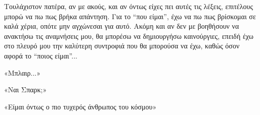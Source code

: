 \documentclass[12pt,twoside, openany]{book}
\begin{document}
Τουλάχιστον πατέρα, αν με ακούς, και αν όντως είχες πει αυτές τις λέξεις, επιτέλους μπορώ να πω πως βρήκα απάντηση. Για το “που είμαι”, έχω να πω πως βρίσκομαι σε καλά χέρια, οπότε μην αγχώνεσαι για αυτό. Ακόμη και αν δεν με βοηθήσουν να ανακτήσω τις αναμνήσεις μου, θα μπορέσω να δημιουργήσω καινούργιες, επειδή έχω στο πλευρό μου την καλύτερη συντροφιά που θα μπορούσα να έχω, καθώς όσον αφορά το “ποιος είμαι”...

«Μπλαιρ...»

«Ναι Σπαρκ;»

«Είμαι όντως ο πιο τυχερός άνθρωπος του κόσμου»


\backmatter

\end{document}
